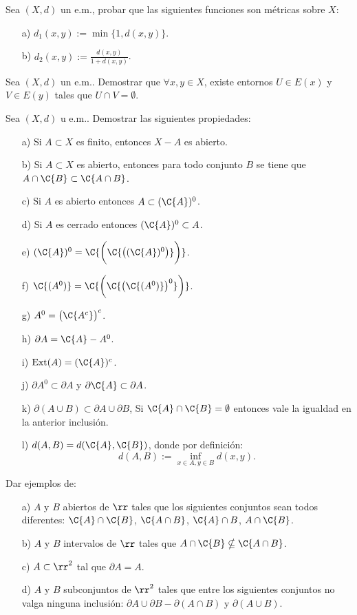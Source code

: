 \begin{ejercicio}\label{ejer,distequiv} Sea $(X,d)$ un e.m., probar que las siguientes
funciones son m\'etricas sobre $X$:
\begin{itemize}
\item[a)] $d_1(x,y):=\min\{1,d(x,y)\}$.
\item[b)] $d_2(x,y):=\frac{d(x,y)}{1+d(x,y)}$.
\end{itemize}
\end{ejercicio}

\begin{ejercicio} Sea $(X,d)$ un e.m.. Demostrar que $\forall
x,y\in X$, existe entornos $U\in E(x)$ y $V\in E(y)$ tales que
$U\cap V=\emptyset$.
\end{ejercicio}

\begin{ejercicio} Sea $(X,d)$ u e.m.. Demostrar las siguientes
propiedades:
\begin{itemize}
	\item[a)] Si $A\subset X$ es finito, entonces $X-A$ es abierto.
	\item[b)] Si $A\subset X$ es abierto, entonces para todo
	conjunto $B$ se tiene que $A\cap \C{B}\subset \C{A\cap B}$.
	\item[c)] Si $A$ es abierto entonces $A\subset (\C{A})^0$.
	\item[d)] Si $A$ es cerrado entonces $(\C{A})^0\subset A$.
	\item[e)]
	$(\C{A})^0=\C{\biggl(\C{\bigl((\C{A})^0\bigr)}\biggr)}$.
	\item[f)]
	$\C{(A^0)}=\C{\biggl(\C{\bigl(\C{(A^0)}\bigr)^0}\biggr)}$.
	\item[g)] $A^0=\bigl(\C{A^c}\bigr)^c$.
	\item[h)] $\partial A=\C{A}-A^0$.
	\item[i)] $\text{Ext}(A)=(\C{A})^c$.
	\item[j)] $\partial A^0\subset \partial A$ y $\partial
	\C{A}\subset \partial A$.
	\item[k)] $\partial (A\cup B)\subset \partial A\cup\partial
	B$, Si $\C{A}\cap\C{B}=\emptyset$ entonces vale la igualdad en
	la anterior inclusi\'on.
	\item[l)] $d(A,B)=d(\C{A},\C{B})$, donde por definici\'on:
	\[
		d(A,B):=\inf\limits_{x\in A,y\in B}d(x,y).
	\]
\end{itemize}
\end{ejercicio}
\begin{ejercicio} Dar ejemplos de:
\begin{itemize}
\item[a)] $A$ y $B$ abiertos de $\rr$ tales que los siguientes
conjuntos sean todos diferentes: $\C{A}\cap \C{B}$, $\C{A\cap B}$,
$\C{A}\cap B$, $A\cap \C{B}$.
\item[b)] $A$ y $B$ intervalos de $\rr$ tales que
$A\cap\C{B}\nsubseteq \C{A\cap B}$.
\item[c)] $A\subset \rr^2$ tal que $\partial A=A$.
\item[d)] $A$ y $B$ subconjuntos de $\rr^2$ tales que entre los
siguientes conjuntos no valga ninguna inclusi\'on: $\partial
A\cup\partial B-\partial(A\cap B)$ y $\partial (A\cup B)$.
\end{itemize}
\end{ejercicio}
